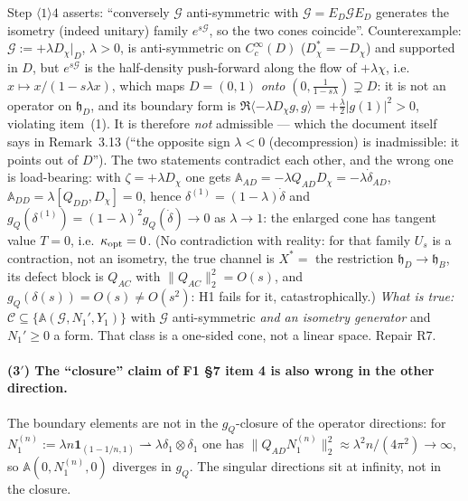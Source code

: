 \documentclass[11pt]{article}
\newcommand{\hh}{\mathfrak h}
\newcommand{\Aop}{\mathbb A}
\begin{document}
\begin{verdictbreak}
Step $\langle1\rangle4$ asserts: ``conversely $\mathcal G$ anti-symmetric with
$\mathcal G=E_D\mathcal GE_D$ generates the isometry (indeed unitary) family
$e^{s\mathcal G}$, so the two cones coincide''.  Counterexample:
$\mathcal G:=+\lambda D_\chi|_D$, $\lambda>0$, is anti-symmetric on $C_c^\infty(D)$
($D_\chi^*=-D_\chi$) and supported in $D$, but $e^{s\mathcal G}$ is the half-density
push-forward along the flow of $+\lambda\chi$, i.e.\ $x\mapsto x/(1-s\lambda x)$, which
maps $D=(0,1)$ \emph{onto} $(0,\frac1{1-s\lambda})\supsetneq D$: it is not an operator on
$\hh_D$, and its boundary form is $\Re\langle-\lambda D_\chi g,g\rangle
=+\frac\lambda2|g(1)|^2>0$, violating item~(1).  It is therefore \emph{not} admissible ---
which the document itself says in Remark~3.13 (``the opposite sign $\lambda<0$
(decompression) is inadmissible: it points out of $D$'').  The two statements contradict
each other, and the wrong one is load-bearing: with $\zeta=+\lambda D_\chi$ one gets
$\Aop_{AD}=-\lambda Q_{AD}D_\chi=-\lambda\dot\delta_{AD}$, $\Aop_{DD}=\lambda[Q_{DD},D_\chi]=0$,
hence $\delta^{(1)}=(1-\lambda)\dot\delta$ and $g_Q(\delta^{(1)})=(1-\lambda)^2g_Q(\dot\delta)
\to0$ as $\lambda\to1$: the enlarged cone has tangent value $T=0$, i.e.\
$\kappa_{\rm opt}=0$.  (No contradiction with reality: for that family $U_s$ is a
contraction, not an isometry, the true channel is $X^*=$ the restriction $\hh_D\to\hh_B$,
its defect block is $Q_{AC}$ with $\|Q_{AC}\|_2^2=O(s)$, and $g_Q(\delta(s))=O(s)\ne O(s^2)$:
H1 fails for it, catastrophically.)
\emph{What is true:} $\mathcal C\subseteq\{\Aop(\mathcal G,N_1',Y_1)\}$ with $\mathcal G$
anti-symmetric \emph{and an isometry generator} and $N_1'\ge0$ a form.  That class is a
one-sided cone, not a linear space.  Repair R7.
\end{verdictbreak}

\paragraph{(3$'$) The ``closure'' claim of F1 \S7 item 4 is also wrong in the other
direction.}  The boundary elements are not in the $g_Q$-closure of the operator directions:
for $N_1^{(n)}:=\lambda n\mathbf1_{(1-1/n,1)}\rightharpoonup\lambda\delta_1\otimes\delta_1$
one has $\|Q_{AD}N_1^{(n)}\|_2^2\approx\lambda^2n/(4\pi^2)\to\infty$, so
$\Aop(0,N_1^{(n)},0)$ diverges in $g_Q$.  The singular directions sit at infinity, not in
the closure.
\end{document}
